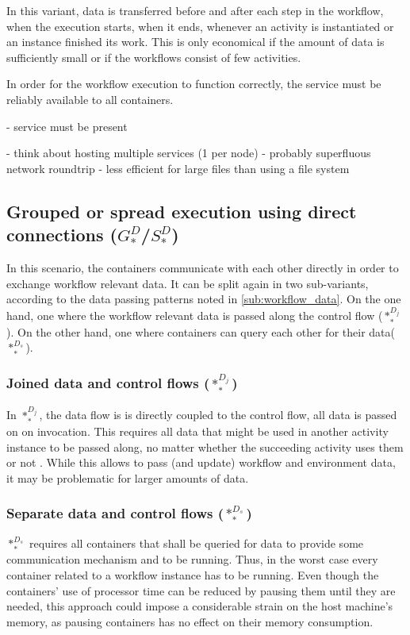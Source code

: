   In this variant, data is transferred before and after each step in the workflow, \ie when the execution starts, when it ends, whenever an activity is instantiated or an instance finished its work. This is only economical if the amount of data is sufficiently small or if the workflows consist of few activities.

  In order for the workflow execution to function correctly, the service must be reliably available to all containers.

  - service must be present

  - think about hosting multiple services (1 per node)
  - probably superfluous network roundtrip
  - less efficient for large files than using a file system


\subsection[Grouped or spread execution using direct connections]{Grouped or spread execution using direct connections ($G_{*}^{D}$/$S_{*}^{D}$)} %
\label{sub:grouped_execution_using_direct_connections}

  In this scenario, the containers communicate with each other directly in order to exchange workflow relevant data. It can be split again in two sub-variants, according to the data passing patterns noted in \ref{sub:workflow_data}. On the one hand, one where the workflow relevant data is passed along the control flow ($*_{*}^{D_j}$). On the other hand, one where containers can query each other for their data($*_{*}^{D_s}$).

  \subsubsection{Joined data and control flows ($*_{*}^{D_j}$)} %
    In $*_{*}^{D_j}$, the data flow is is directly coupled to the control flow, \ie all data is passed on on invocation. This requires all data that might be used in another activity instance to be passed along, no matter whether the succeeding activity uses them or not \cite{Russell2005Workflow}. While this allows to pass (and update) workflow and environment data, it may be problematic for larger amounts of data.

  \subsubsection{Separate data and control flows ($*_{*}^{D_s}$)} %
    $*_{*}^{D_s}$ requires all containers that shall be queried for data to provide some communication mechanism and to be running. Thus, in the worst case every container related to a workflow instance has to be running. Even though the containers' use of processor time can be reduced by pausing them until they are needed, this approach could impose a considerable strain on the host machine's memory, as pausing containers has no effect on their memory consumption.

